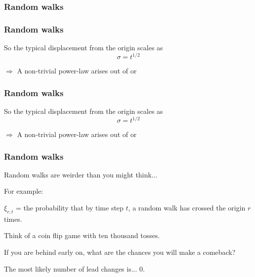 \begin{frame}
  \frametitle{Random walks}


\end{frame}

\begin{frame}
  \frametitle{Random walks}

  So the typical displacement from the origin
  scales as 
  $$\sigma = t^{1/2}$$

  \inv

  $\Rightarrow$ A non-trivial power-law arises out
  of  or 

\end{frame}

\begin{frame}
  \frametitle{Random walks}

  So the typical displacement from the origin
  scales as 
  $$\sigma = t^{1/2}$$

  $\Rightarrow$ A non-trivial power-law arises out
  of  or 

\end{frame}

\begin{frame}
  \frametitle{Random walks}

  Random walks are weirder than you might think...

  \inv

  For example:

  $\xi_{r,t}$ = the probability that by time step $t$,
  a random walk has crossed the origin $r$ times.

  Think of a coin flip game with ten thousand tosses.

  If you are behind early on, what are the chances you
  will make a comeback?

  The most likely number of lead changes is...  
  0.


\end{frame}

